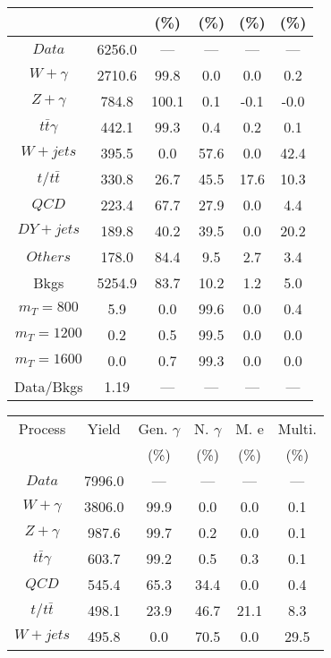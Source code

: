 \begin{figure}
\begin{minipage}[c]{0.32\textwidth}
{\begin{tabular}{cccccc}
 &  & (\%) & (\%) & (\%) & (\%)  \\
\hline
                                                                      $ Data $ &  6256.0 &  --- &  --- &  --- &  ---\\
$ W+\gamma $ &  2710.6 &  99.8 &  0.0 &  0.0 &  0.2\\
$ Z+\gamma $ &  784.8 &  100.1 &  0.1 &  -0.1 &  -0.0\\
$ t\bar{t}\gamma $ &  442.1 &  99.3 &  0.4 &  0.2 &  0.1\\
$ W+jets $ &  395.5 &  0.0 &  57.6 &  0.0 &  42.4\\
$ t/t\bar{t} $ &  330.8 &  26.7 &  45.5 &  17.6 &  10.3\\
$ QCD $ &  223.4 &  67.7 &  27.9 &  0.0 &  4.4\\
$ DY+jets $ &  189.8 &  40.2 &  39.5 &  0.0 &  20.2\\
$ Others $ &  178.0 &  84.4 &  9.5 &  2.7 &  3.4\\
Bkgs &  5254.9 &  83.7 &  10.2 &  1.2 &  5.0\\
$ m_{T} = 800 $ &  5.9 &  0.0 &  99.6 &  0.0 &  0.4\\
$ m_{T} = 1200 $ &  0.2 &  0.5 &  99.5 &  0.0 &  0.0\\
$ m_{T} = 1600 $ &  0.0 &  0.7 &  99.3 &  0.0 &  0.0\\
Data/Bkgs &  1.19 &  --- &  --- &  --- &  ---\\
\hline
\end{tabular}
}
\end{minipage}
\begin{minipage}[c]{0.32\textwidth}
\centering
\tiny{
\begin{tabular}{cccccc}
\hline
Process & Yield & Gen. $\gamma$ & N. $\gamma$ & M. e & Multi. \\
 &  & (\%) & (\%) & (\%) & (\%)  \\
\hline
                                                                      $ Data $ &  7996.0 &  --- &  --- &  --- &  ---\\
$ W+\gamma $ &  3806.0 &  99.9 &  0.0 &  0.0 &  0.1\\
$ Z+\gamma $ &  987.6 &  99.7 &  0.2 &  0.0 &  0.1\\
$ t\bar{t}\gamma $ &  603.7 &  99.2 &  0.5 &  0.3 &  0.1\\
$ QCD $ &  545.4 &  65.3 &  34.4 &  0.0 &  0.4\\
$ t/t\bar{t} $ &  498.1 &  23.9 &  46.7 &  21.1 &  8.3\\
$ W+jets $ &  495.8 &  0.0 &  70.5 &  0.0 &  29.5\\

\end{tabular}}
\end{minipage}
\end{figure}
